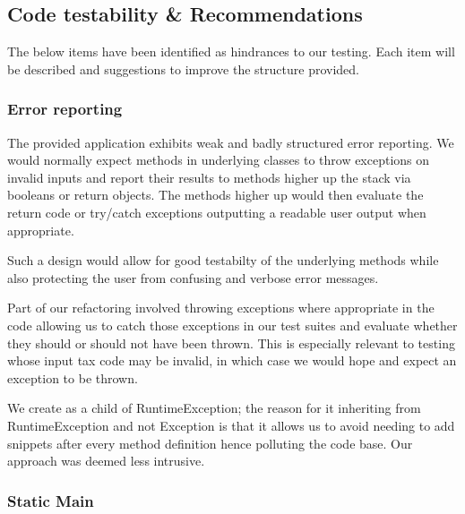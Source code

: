 \subsection{Code testability \& Recommendations}
The below items have been identified as hindrances to our testing. Each item will be described and suggestions to improve the structure provided. 

\subsubsection{Error reporting}
\label{sec:error-reporting}
The provided application exhibits weak and badly structured error reporting. We would normally expect methods in underlying classes to throw exceptions on invalid inputs and report their results to methods higher up the stack via booleans or return objects. The methods higher up would then evaluate the return code or try/catch exceptions outputting a readable user output when appropriate.
\par
Such a design would allow for good testabilty of the underlying methods while also protecting the user from confusing and verbose error messages. 
\par 
Part of our refactoring involved throwing exceptions where appropriate in the code allowing us to catch those exceptions in our test suites and evaluate whether they should or should not have been thrown. 
This is especially relevant to testing  whose input tax code may be invalid, in which case we would hope and expect an exception to be thrown. 
\par 
We create  as a child of RuntimeException; the reason for it inheriting from RuntimeException and not Exception is that it allows us to avoid needing to add snippets  after every method definition hence polluting the code base. 
Our approach was deemed less intrusive. 

\subsubsection{Static Main}

